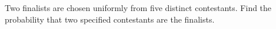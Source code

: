 Two finalists are chosen uniformly from five distinct contestants. Find the probability that two specified contestants are the finalists.
